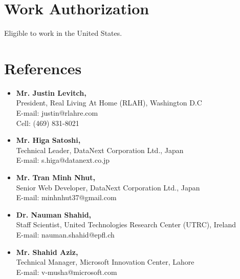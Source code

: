 \documentclass[margin,line]{res}
\begin{document}
\begin{resume}
\section{Work Authorization}
Eligible to work in the United States.
\section{References}
\begin{itemize} \itemsep -2pt  %

 \item {\bf Mr. Justin Levitch,}\\
  President, Real Living At Home (RLAH), Washington D.C \\
  E-mail: justin@rlahre.com \\
  Cell:  (469) 831-8021\\

  \item {\bf Mr. Higa Satoshi,}\\
  Technical Leader, DataNext Corporation Ltd., Japan \\
  E-mail: s.higa@datanext.co.jp \\

  \item {\bf Mr. Tran Minh Nhut,}\\
  Senior Web Developer, DataNext Corporation Ltd., Japan \\
  E-mail: minhnhut37@gmail.com \\

  \item {\bf Dr. Nauman Shahid,}\\
  Staff Scientist, United Technologies Research Center (UTRC), Ireland \\
  E-mail: nauman.shahid@epfl.ch \\

  \item {\bf Mr. Shahid Aziz,}\\
  Technical Manager, Microsoft Innovation Center, Lahore \\
  E-mail: v-musha@microsoft.com \\

\end{itemize}

\end{resume} 
\end{document}
